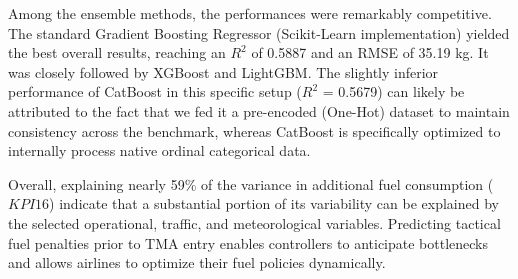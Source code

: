 Among the ensemble methods, the performances were remarkably competitive. The standard Gradient Boosting Regressor (Scikit-Learn implementation) yielded the best overall results, reaching an $R^2$ of 0.5887 and an RMSE of 35.19 kg. It was closely followed by XGBoost and LightGBM. The slightly inferior performance of CatBoost in this specific setup ($R^2$ = 0.5679) can likely be attributed to the fact that we fed it a pre-encoded (One-Hot) dataset to maintain consistency across the benchmark, whereas CatBoost is specifically optimized to internally process native ordinal categorical data.

Overall, explaining nearly 59\% of the variance in additional fuel consumption ($KPI16$) indicate that a substantial portion of its variability can be explained by the selected operational, traffic, and meteorological variables. Predicting tactical fuel penalties prior to TMA entry enables controllers to anticipate bottlenecks and allows airlines to optimize their fuel policies dynamically.
